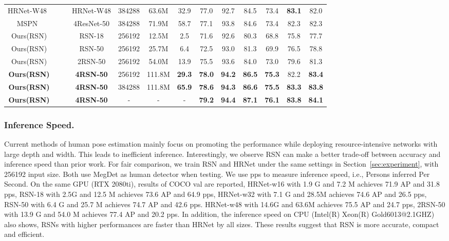 \documentclass[runningheads]{llncs}
\begin{document}
\begin{table*}[h]
{\begin{tabular}{c|c|c|c|c|c|c|cccccc}
HRNet-W48~\cite{hrnet} && &HRNet-W48    &384288 &63.6M &32.9 &77.0 &92.7 &84.5 &73.4 &\textbf{83.1} &82.0 \\
MSPN~\cite{mspn} && &4ResNet-50   &384288 &71.9M &58.7 &77.1 &93.8 &84.6 &73.4 &82.3 &82.3  \\
    \hline
Ours(RSN) && &RSN-18  &256192 &12.5M &2.5 &71.6 &92.6 &80.3 &68.8 &75.8 &77.7 \\
Ours(RSN) && &RSN-50  &256192 &25.7M &6.4 &72.5 &93.0 &81.3 &69.9 &76.5 &78.8 \\
Ours(RSN) && &2RSN-50  &256192 &54.0M &13.9 &75.5 &93.6 &84.0 &73.0 &79.6 &81.3 \\
\textbf{Ours(RSN)} && &\textbf{4RSN-50}  &256192 &111.8M &\textbf{29.3} &\textbf{78.0} &\textbf{94.2} &\textbf{86.5} &\textbf{75.3} &82.2 &\textbf{83.4} \\
\textbf{Ours(RSN)}&& &\textbf{4RSN-50} &384288 &111.8M &\textbf{65.9} &\textbf{78.6} &\textbf{94.3} &\textbf{86.6} &\textbf{75.5} &\textbf{83.3} &\textbf{83.8} \\
\textbf{Ours(RSN)} && &\textbf{4RSN-50} &- &- &-&\textbf{79.2} &\textbf{94.4} &\textbf{87.1} &\textbf{76.1} &\textbf{83.8} &\textbf{84.1} \\
\hline
\hline
  \end{tabular}
  }
  
  \label{tb:test-dev}
\end{table*}




\subsubsection{Inference Speed.}\label{sec:inference_speed}
Current methods of human pose estimation mainly focus on promoting the performance while deploying resource-intensive networks with large depth and width. This leads to inefficient inference. Interestingly, we observe RSN can make a better trade-off between accuracy and inference speed than prior work.  For fair comparison, we train RSN and HRNet under the same settings in Section~\ref{sec:experiment}, with 256192 input size. Both use MegDet as   human detector when testing. We use pps to measure inference speed, i.e., Persons inferred Per Second. On the same GPU (RTX 2080ti), results of COCO val are reported, HRNet-w16 with 1.9 G and 7.2 M achieves 71.9 AP and 31.8 pps, RSN-18 with 2.5G and 12.5 M achieves 73.6 AP and
64.9 pps, HRNet-w32 with 7.1 G and 28.5M achieves 74.6 AP and 26.5 pps, RSN-50 with 6.4 G and 25.7 M achieves 74.7 AP and 42.6 pps. HRNet-w48 with 14.6G and 63.6M achieves 75.5 AP and 24.7 pps, 2RSN-50 with 13.9 G and 54.0 M achieves 77.4 AP and 20.2 pps. In addition, the inference speed on CPU (Intel(R) Xeon(R) Gold6013@2.1GHZ) also shows, RSNs with higher performances are faster than HRNet by all sizes. These results suggest that RSN is more accurate, compact and efficient.
\end{document}
